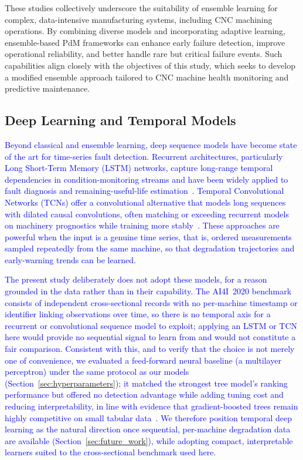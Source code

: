 \documentclass[final,5p, twocolumn]{elsarticle}
\begin{document}
These studies collectively underscore the suitability of ensemble learning for complex, data-intensive manufacturing systems, including CNC machining operations. By combining diverse models and incorporating adaptive learning, ensemble-based PdM frameworks can enhance early failure detection, improve operational reliability, and better handle rare but critical failure events. Such capabilities align closely with the objectives of this study, which seeks to develop a modified ensemble approach tailored to CNC machine health monitoring and predictive maintenance.

\subsection{Deep Learning and Temporal Models}
\textcolor{blue}{Beyond classical and ensemble learning, deep sequence models have become state of the art for time-series fault detection. Recurrent architectures, particularly Long Short-Term Memory (LSTM) networks, capture long-range temporal dependencies in condition-monitoring streams and have been widely applied to fault diagnosis and remaining-useful-life estimation~\cite{zhao2019deep,zheng2017long,hochreiter1997long}. Temporal Convolutional Networks (TCNs) offer a convolutional alternative that models long sequences with dilated causal convolutions, often matching or exceeding recurrent models on machinery prognostics while training more stably~\cite{bai2018empirical,lea2017temporal}. These approaches are powerful when the input is a genuine time series, that is, ordered measurements sampled repeatedly from the same machine, so that degradation trajectories and early-warning trends can be learned.}

\textcolor{blue}{The present study deliberately does not adopt these models, for a reason grounded in the data rather than in their capability. The AI4I~2020 benchmark consists of independent cross-sectional records with no per-machine timestamp or identifier linking observations over time, so there is no temporal axis for a recurrent or convolutional sequence model to exploit; applying an LSTM or TCN here would provide no sequential signal to learn from and would not constitute a fair comparison. Consistent with this, and to verify that the choice is not merely one of convenience, we evaluated a feed-forward neural baseline (a multilayer perceptron) under the same protocol as our models (Section~\ref{sec:hyperparameters}); it matched the strongest tree model's ranking performance but offered no detection advantage while adding tuning cost and reducing interpretability, in line with evidence that gradient-boosted trees remain highly competitive on small tabular data~\cite{grinsztajn2022tree,shwartz2022tabular}. We therefore position temporal deep learning as the natural direction once sequential, per-machine degradation data are available (Section~\ref{sec:future_work}), while adopting compact, interpretable learners suited to the cross-sectional benchmark used here.}
\end{document}
